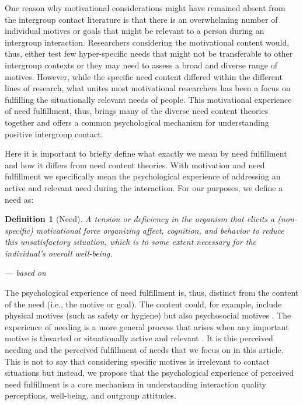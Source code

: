 \documentclass[man, 12pt, a4paper, mask]{apa7}
\theoremstyle{break}
\newtheorem{definition}{Definition}
\theoremstyle{plain}
\begin{document}
One reason why motivational considerations might have remained absent from the intergroup contact literature is that there is an overwhelming number of individual motives or goals that might be relevant to a person during an intergroup interaction. Researchers considering the motivational content would, thus, either test few hyper-specific needs that might not be transferable to other intergroup contexts or they may need to assess a broad and diverse range of motives. However, while the specific need content differed within the different lines of research, what unites most motivational researchers has been a focus on fulfilling the situationally relevant needs of people. This motivational experience of need fulfillment, thus, brings many of the diverse need content theories together and offers a common psychological mechanism for understanding positive intergroup contact.

Here it is important to briefly define what exactly we mean by need fulfillment and how it differs from need content theories. With motivation and need fulfillment we specifically mean the psychological experience of addressing an active and relevant need during the interaction. For our purposes, we define a need as:

\begin{definition}[Need]\label{def:need}
A tension or deficiency in the organism that elicits a (non-specific) motivational force organizing affect, cognition, and behavior to reduce this unsatisfactory situation, which is to some extent necessary for the individual’s overall well-being.
\begin{flushright}
--- based on \citet[][]{dweck2017, Hull1943, kruglanski2002, Lewin1938, McClelland1987, Ryan2017, Steverink2006}
\end{flushright}
\end{definition}

The psychological experience of need fulfillment is, thus, distinct from the content of the need (i.e., the motive or goal). The content could, for example, include physical motives (such as safety or hygiene) but also psychosocial motives \citep[such as acceptance or competence; e.g., see][]{pittman2007}. The experience of needing is a more general process that arises when any important motive is thwarted or situationally active and relevant \citep[][]{leander2020, lewin1926e, gollwitzer1985e}. It is this perceived needing and the perceived fulfillment of needs that we focus on in this article. This is not to say that considering specific motives is irrelevant to contact situations but instead, we propose that the psychological experience of perceived need fulfillment is a core mechanism in understanding interaction quality perceptions, well-being, and outgroup attitudes.
\end{document}
